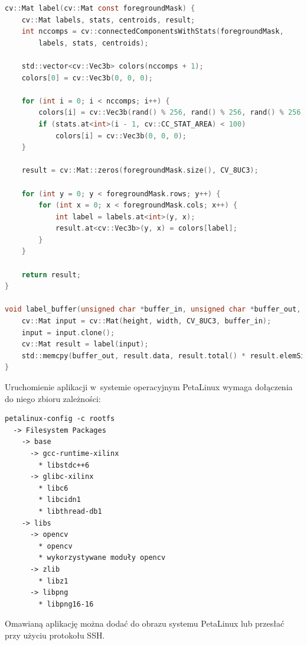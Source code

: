 \begin{lstlisting}[breaklines,language=C, label=lis:opencv-label-module, caption=Moduł indeksacji obiektów pierwszoplanowych.]
cv::Mat label(cv::Mat const foregroundMask) {
	cv::Mat labels, stats, centroids, result;
	int nccomps = cv::connectedComponentsWithStats(foregroundMask,
		labels, stats, centroids);

	std::vector<cv::Vec3b> colors(nccomps + 1);
	colors[0] = cv::Vec3b(0, 0, 0);
	
	for (int i = 0; i < nccomps; i++) {
		colors[i] = cv::Vec3b(rand() % 256, rand() % 256, rand() % 256);
		if (stats.at<int>(i - 1, cv::CC_STAT_AREA) < 100)
			colors[i] = cv::Vec3b(0, 0, 0);
	}
	
	result = cv::Mat::zeros(foregroundMask.size(), CV_8UC3);
	
	for (int y = 0; y < foregroundMask.rows; y++) {
		for (int x = 0; x < foregroundMask.cols; x++) {
			int label = labels.at<int>(y, x);
			result.at<cv::Vec3b>(y, x) = colors[label];
		}
	}
	
	return result;
}

void label_buffer(unsigned char *buffer_in, unsigned char *buffer_out, int width, int height) {
	cv::Mat input = cv::Mat(height, width, CV_8UC3, buffer_in);
	input = input.clone();
	cv::Mat result = label(input);
	std::memcpy(buffer_out, result.data, result.total() * result.elemSize());
}
\end{lstlisting}

Uruchomienie aplikacji w~systemie operacyjnym PetaLinux wymaga dołączenia do niego zbioru zależności: 
\begin{lstlisting}
petalinux-config -c rootfs
  -> Filesystem Packages
    -> base
      -> gcc-runtime-xilinx
        * libstdc++6
      -> glibc-xilinx
        * libc6
        * libcidn1
        * libthread-db1
    -> libs
      -> opencv
        * opencv
        * wykorzystywane moduły opencv
      -> zlib
        * libz1
      -> libpng
        * libpng16-16
\end{lstlisting}

Omawianą aplikację można dodać do obrazu systemu PetaLinux lub przesłać przy użyciu protokołu SSH.

